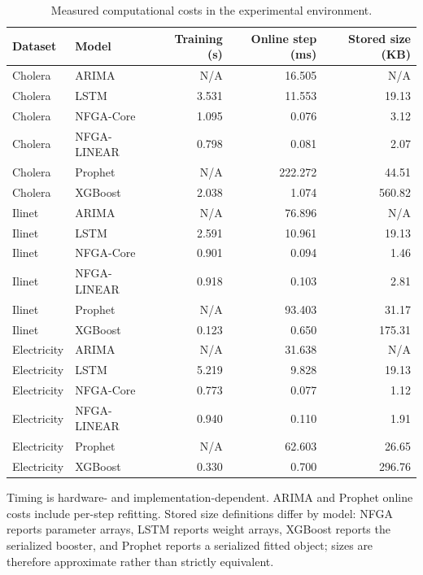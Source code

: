 \begin{table}[t]
\centering
\caption{Measured computational costs in the experimental environment.}
\label{tab:resource_cost}
\begin{tabular}{llrrr}
\toprule
Dataset & Model & Training (s) & Online step (ms) & Stored size (KB) \\
\midrule
Cholera & ARIMA & N/A & 16.505 & N/A \\
Cholera & LSTM & 3.531 & 11.553 & 19.13 \\
Cholera & NFGA-Core & 1.095 & 0.076 & 3.12 \\
Cholera & NFGA-LINEAR & 0.798 & 0.081 & 2.07 \\
Cholera & Prophet & N/A & 222.272 & 44.51 \\
Cholera & XGBoost & 2.038 & 1.074 & 560.82 \\
\midrule
Ilinet & ARIMA & N/A & 76.896 & N/A \\
Ilinet & LSTM & 2.591 & 10.961 & 19.13 \\
Ilinet & NFGA-Core & 0.901 & 0.094 & 1.46 \\
Ilinet & NFGA-LINEAR & 0.918 & 0.103 & 2.81 \\
Ilinet & Prophet & N/A & 93.403 & 31.17 \\
Ilinet & XGBoost & 0.123 & 0.650 & 175.31 \\
\midrule
Electricity & ARIMA & N/A & 31.638 & N/A \\
Electricity & LSTM & 5.219 & 9.828 & 19.13 \\
Electricity & NFGA-Core & 0.773 & 0.077 & 1.12 \\
Electricity & NFGA-LINEAR & 0.940 & 0.110 & 1.91 \\
Electricity & Prophet & N/A & 62.603 & 26.65 \\
Electricity & XGBoost & 0.330 & 0.700 & 296.76 \\
\midrule
\bottomrule
\end{tabular}
\begin{minipage}{0.98\linewidth}
\footnotesize Timing is hardware- and implementation-dependent. ARIMA and Prophet online costs include per-step refitting. Stored size definitions differ by model: NFGA reports parameter arrays, LSTM reports weight arrays, XGBoost reports the serialized booster, and Prophet reports a serialized fitted object; sizes are therefore approximate rather than strictly equivalent.
\end{minipage}
\end{table}